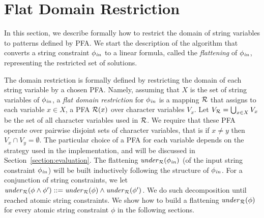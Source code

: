 \documentclass[sigplan,review,anonymous]{acmart}\settopmatter{printfolios=true,printccs=false,printacmref=false}
\begin{document}
%	
%	
%	
%
%

\section{Flat Domain Restriction}
\label{section:under_approximate}

%
In this section, we describe formally how to restrict the domain of string variables to patterns defined by PFA. 
We start the description of the algorithm that converts a string constraint $\phi_{\mathit{in}}$ to a linear formula, called the \emph{flattening} of $\phi_{\mathit{in}}$, representing the restricted set of solutions.  
%

The domain restriction is formally defined by restricting the domain of each string variable by a chosen PFA. 
%
Namely, assuming that $X$ is the set of string variables of $\phi_{\mathit{in}}$,
a \emph{flat domain restriction} for $\phi_{\mathit{in}}$ is a mapping $\mathcal{R}$ that assigns to each variable $x\in X$, a PFA $\mathcal{R}(x)$ over character variables $V_x$. Let $V_{\mathcal{R}} = \bigcup_{x\in X} V_x$ be the set of all character variables used in $\mathcal{R}$.
We require that these PFA operate over pairwise disjoint sets of character variables, that is if $x\neq y$ then $V_x \cap V_y = \emptyset$.
%
The particular choice of a PFA 
for each variable depends on the strategy used in the implementation, and will be discussed in Section~\ref{section:evaluation}.
%
The flattening $\mathit{under}_{\mathcal{R}}(\phi_{\mathit{in}})$ (of the input string constraint $\phi_{\mathit{in}}$) will be built inductively following the structure of $\phi_{\mathit{in}}$.
For a conjunction of string constraints, we let $\mathit{under}_{\mathcal{R}}(\phi \land \phi') ::= \mathit{under}_{\mathcal{R}}(\phi) \land \mathit{under}_{\mathcal{R}}(\phi')$. We do such decomposition until reached atomic string constraints. We show how to build a flattening $\mathit{under}_{\mathcal{R}}(\phi)$ for every atomic string constraint $\phi$ in the following sections.
\end{document}
